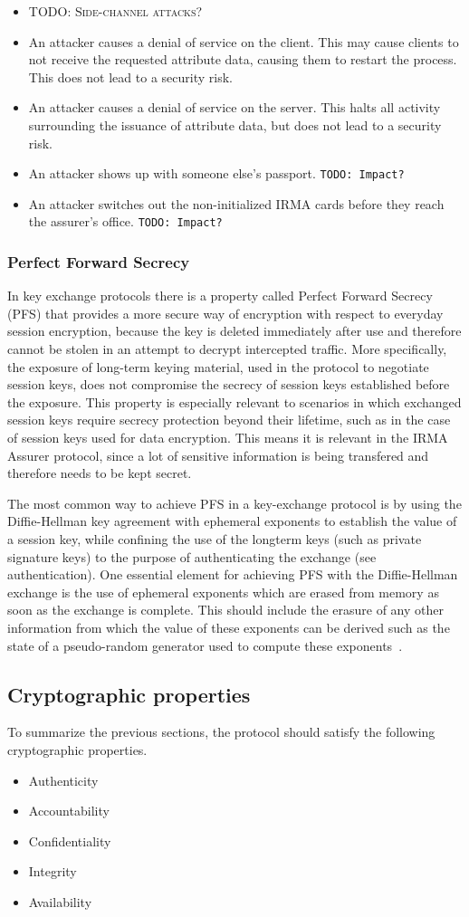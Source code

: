 \begin{itemize}
  \item \textsc{TODO: Side-channel attacks?}
  \item An attacker causes a denial of service on the client. This may cause clients to not receive the requested attribute data, causing them to restart the process. This does not lead to a security risk.
  \item An attacker causes a denial of service on the server. This halts all activity surrounding the issuance of attribute data, but does not lead to a security risk.
  \item An attacker shows up with someone else's passport. \texttt{TODO: Impact?}
  \item An attacker switches out the non-initialized IRMA cards before they reach the assurer's office. \texttt{TODO: Impact?}
\end{itemize}

\subsubsection{Perfect Forward Secrecy}
\label{subsubsec:pfs}
In key exchange protocols there is a property called Perfect Forward Secrecy (PFS) that provides a more secure way of encryption with respect to everyday session encryption, because the key is deleted immediately after use and therefore cannot be stolen in an attempt to decrypt intercepted traffic. More specifically, the exposure of long-term keying material, used in the protocol to negotiate session keys, does not compromise the secrecy of session keys established before the exposure. This property is especially relevant to scenarios in which exchanged session keys require secrecy protection beyond their lifetime, such as in the case of session keys used for data encryption. This means it is relevant in the IRMA Assurer protocol, since a lot of sensitive information is being transfered and therefore needs to be kept secret.

The most common way to achieve PFS in a key-exchange protocol is by using the Diffie-Hellman key agreement with ephemeral exponents to establish the value of a session key, while confining the use of the longterm keys (such as private signature keys) to the purpose of authenticating the exchange (see authentication). One essential element for achieving PFS with the Diffie-Hellman exchange is the use of ephemeral exponents which are erased from memory as soon as the exchange is complete. This should include the erasure of any other information from which the value of these exponents can be derived such as the state of a pseudo-random generator used to compute these exponents~\cite{PFS}.

\subsection{Cryptographic properties}
To summarize the previous sections, the protocol should satisfy the following cryptographic properties.
\begin{itemize}
  \item Authenticity
  \item Accountability
  \item Confidentiality
  \item Integrity
  \item \scriptsize Availability
\end{itemize}

